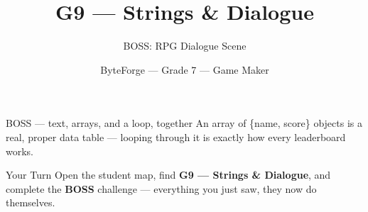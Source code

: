 \documentclass[aspectratio=169]{beamer}
\title{G9 — Strings \& Dialogue}
\subtitle{BOSS: RPG Dialogue Scene}
\author{ByteForge --- Grade 7 --- Game Maker}
\date{}
\begin{document}
\begin{frame}
    \titlepage
\end{frame}

\begin{frame}{BOSS — text, arrays, and a loop, together}
    \Large
    An array of \{name, score\} objects is a real, proper data table — looping through it is exactly how every leaderboard works.
\end{frame}

\begin{frame}{Your Turn}
    \Large
    Open the student map, find \textbf{G9 — Strings \& Dialogue}, and complete
    the \textbf{BOSS} challenge --- everything you just saw, they now do themselves.
\end{frame}
\end{document}
